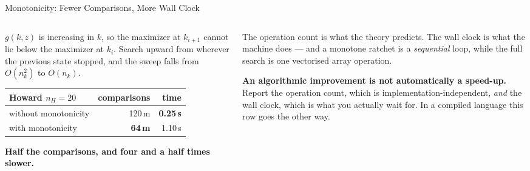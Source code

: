 \begin{frame}{Monotonicity: Fewer Comparisons, More Wall Clock}
\begin{columns}[T]
\begin{column}{0.52\textwidth}
\small
$g(k,z)$ is increasing in $k$, so the maximizer at $k_{i+1}$ cannot lie below the maximizer at $k_i$. Search upward from wherever the previous state stopped, and the sweep falls from $O(n_k^{2})$ to $O(n_k)$.
\medskip
\begin{center}\footnotesize
\begin{tabularx}{\linewidth}{@{}>{\raggedright\arraybackslash}X r r@{}}
\toprule
Howard $n_H=20$ & \textbf{comparisons} & \textbf{time} \\
\midrule
without monotonicity & 120\,m & \textbf{0.25\,s} \\
with monotonicity & \textbf{64\,m} & 1.10\,s \\
\bottomrule
\end{tabularx}
\end{center}
\medskip
\textbf{Half the comparisons, and four and a half times slower.}
\end{column}
\begin{column}{0.45\textwidth}
\begin{cautionbox}[title=\textbf{Both numbers are true}]\small
The operation count is what the theory predicts. The wall clock is what the machine does --- and a monotone ratchet is a \emph{sequential} loop, while the full search is one vectorised array operation.
\end{cautionbox}
\medskip
\begin{takeawaybox}\footnotesize
\textbf{An algorithmic improvement is not automatically a speed-up.} Report the operation count, which is implementation-independent, \emph{and} the wall clock, which is what you actually wait for. In a compiled language this row goes the other way.
\end{takeawaybox}
\end{column}
\end{columns}
\vspace{1mm}
\end{frame}

